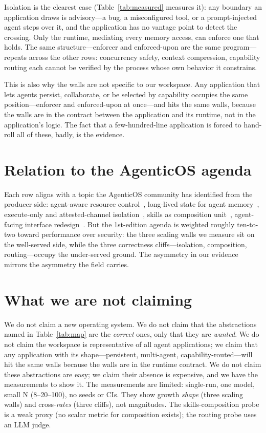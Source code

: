 \documentclass[sigconf, review, anonymous]{acmart}
\begin{document}
Isolation is the clearest case (Table~\ref{tab:measured} measures it): any
boundary an application draws is advisory---a bug, a misconfigured tool, or
a prompt-injected agent steps over it, and the application has no vantage
point to detect the crossing. Only the runtime, mediating every memory
access, can enforce one that holds. The same structure---enforcer and
enforced-upon are the same program---repeats across the other rows:
concurrency safety, context compression, capability routing each cannot be
verified by the process whose own behavior it constrains.

This is also why the walls are not specific to our workspace. Any
application that lets agents persist, collaborate, or be selected by
capability occupies the same position---enforcer and enforced-upon at
once---and hits the same walls, because the walls are in the contract
between the application and its runtime, not in the application's logic.
The fact that a few-hundred-line application is forced to hand-roll all of
these, badly, is the evidence.

\section{Relation to the AgenticOS agenda}

Each row aligns with a topic the AgenticOS community has identified from the
producer side: agent-aware resource control~\cite{agentcgroup},
long-lived state for agent memory~\cite{agenticos}, execute-only and
attested-channel isolation~\cite{execonly,grimlock}, skills as composition
unit~\cite{skillos}, agent-facing interface redesign~\cite{rethos}. But the
1st-edition agenda is weighted roughly ten-to-two toward performance over
security: the three scaling walls we measure sit on the well-served side,
while the three correctness cliffs---isolation, composition, routing---occupy
the under-served ground. The asymmetry in our evidence mirrors the asymmetry
the field carries.

\section{What we are not claiming}
\label{sec:notclaiming}

We do not claim a new operating system. We do not claim that the
abstractions named in Table~\ref{tab:map} are the \emph{correct} ones, only
that they are \emph{wanted}. We do not claim the workspace is
representative of all agent applications; we claim that any application
with its shape---persistent, multi-agent, capability-routed---will hit the
same walls because the walls are in the runtime contract. We do not claim
these abstractions are easy; we claim their absence is expensive, and we
have the measurements to show it. The measurements are limited: single-run,
one model, small N (8--20--100), no seeds or CIs. They show growth
\emph{shape} (three scaling walls) and cross-\emph{rates} (three cliffs),
not magnitudes. The skills-composition probe is a weak proxy (no scalar
metric for composition exists); the routing probe uses an LLM judge.
\end{document}
